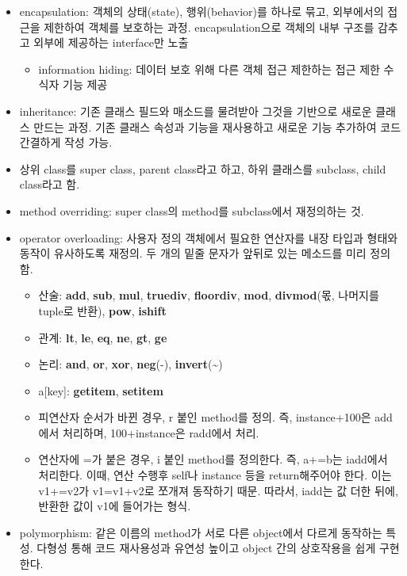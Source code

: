 \begin{itemize}
\tightlist
\item
  encapsulation: 객체의 상태(state), 행위(behavior)를 하나로 묶고,
  외부에서의 접근을 제한하여 객체를 보호하는 과정. encapsulation으로
  객체의 내부 구조를 감추고 외부에 제공하는 interface만 노출

  \begin{itemize}
  \tightlist
  \item
    information hiding: 데이터 보호 위해 다른 객체 접근 제한하는 접근
    제한 수식자 기능 제공
  \end{itemize}
\item
  inheritance: 기존 클래스 필드와 매소드를 물려받아 그것을 기반으로
  새로운 클래스 만드는 과정. 기존 클래스 속성과 기능을 재사용하고 새로운
  기능 추가하여 코드 간결하게 작성 가능.
\item
  상위 class를 super class, parent class라고 하고, 하위 클래스를
  subclass, child class라고 함.
\item
  method overriding: super class의 method를 subclass에서 재정의하는 것.
\item
  operator overloading: 사용자 정의 객체에서 필요한 연산자를 내장 타입과
  형태와 동작이 유사하도록 재정의. 두 개의 밑줄 문자가 앞뒤로 있는
  메소드를 미리 정의함.

  \begin{itemize}
  \tightlist
  \item
    산술: \textbf{add}, \textbf{sub}, \textbf{mul}, \textbf{truediv},
    \textbf{floordiv}, \textbf{mod}, \textbf{divmod}(몫, 나머지를
    tuple로 반환), \textbf{pow}, \textbf{ishift}
  \item
    관계: \textbf{lt}, \textbf{le}, \textbf{eq}, \textbf{ne},
    \textbf{gt}, \textbf{ge}
  \item
    논리: \textbf{and}, \textbf{or}, \textbf{xor}, \textbf{neg}(-),
    \textbf{invert}(\textasciitilde)
  \item
    a{[}key{]}: \textbf{getitem}, \textbf{setitem}
  \item
    피연산자 순서가 바뀐 경우, r 붙인 method를 정의. 즉, instance+100은
    add에서 처리하며, 100+instance은 radd에서 처리.
  \item
    연산자에 =가 붙은 경우, i 붙인 method를 정의한다. 즉, a+=b는
    iadd에서 처리한다. 이때, 연산 수행후 self나 instance 등을
    return해주어야 한다. 이는 v1+=v2가 v1=v1+v2로 쪼개져 동작하기 때문.
    따라서, iadd는 값 더한 뒤에, 반환한 값이 v1에 들어가는 형식.
  \end{itemize}
\item
  polymorphism: 같은 이름의 method가 서로 다른 object에서 다르게
  동작하는 특성. 다형성 통해 코드 재사용성과 유연성 높이고 object 간의
  상호작용을 쉽게 구현한다.


\end{itemize}
